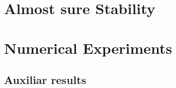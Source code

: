 \documentclass[1p,sort&compress]{elsarticle}
\begin{document}
	\section{Almost sure Stability}
		
	\section{Numerical Experiments}
		
	\appendix
	\begin{appendices}
		\section{Auxiliar results}
			
	\end{appendices}
	\section*{\refname}
	
	
\end{document}
